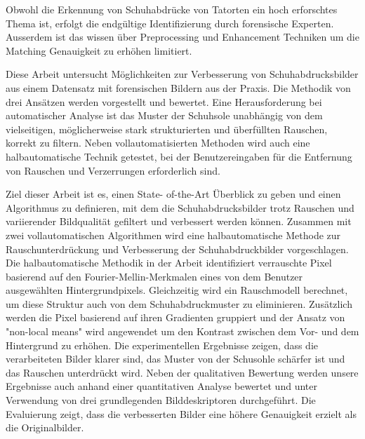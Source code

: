 \documentclass[draft,final]{vutinfth} %
\begin{document}
\frontmatter %

\addstatementpage



\begin{kurzfassung}
\par
Obwohl die Erkennung von Schuhabdrücke von Tatorten ein hoch erforschtes Thema ist, erfolgt die endgültige Identifizierung  durch forensische Experten.
Ausserdem ist das wissen über Preprocessing und Enhancement Techniken um die Matching Genauigkeit zu erhöhen limitiert.
\par
Diese Arbeit untersucht Möglichkeiten zur Verbesserung von Schuhabdrucksbilder aus einem Datensatz mit forensischen Bildern aus der Praxis. 
Die Methodik von drei Ansätzen werden vorgestellt und bewertet. 
Eine Herausforderung bei automatischer Analyse ist das Muster der Schuhsole unabhängig von dem vielseitigen, möglicherweise stark strukturierten und überfüllten Rauschen, korrekt zu filtern.
Neben vollautomatisierten Methoden wird auch eine halbautomatische Technik getestet, bei der Benutzereingaben für die Entfernung von Rauschen und Verzerrungen erforderlich sind. 
\par
Ziel dieser Arbeit ist es, einen State- of-the-Art Überblick zu geben und einen Algorithmus zu definieren, mit dem die Schuhabdrucksbilder trotz Rauschen und variierender Bildqualität gefiltert und verbessert werden können.
Zusammen mit zwei vollautomatischen Algorithmen wird eine halbautomatische Methode zur Rauschunterdrückung und Verbesserung der Schuhabdruckbilder vorgeschlagen. 
Die halbautomatische Methodik in der Arbeit identifiziert verrauschte Pixel basierend auf den Fourier-Mellin-Merkmalen eines von dem Benutzer ausgewählten Hintergrundpixels. 
Gleichzeitig wird ein Rauschmodell berechnet, um diese Struktur auch von dem Schuhabdruckmuster zu eliminieren. 
Zusätzlich werden die Pixel basierend auf ihren Gradienten gruppiert und der Ansatz von "non-local means" wird angewendet um den Kontrast zwischen dem Vor- und dem Hintergrund zu erhöhen.
Die experimentellen Ergebnisse zeigen, dass die verarbeiteten Bilder klarer sind, das Muster von der Schusohle schärfer ist und das Rauschen unterdrückt wird. 
Neben der qualitativen Bewertung werden unsere Ergebnisse auch anhand einer quantitativen Analyse bewertet und unter Verwendung von drei grundlegenden Bilddeskriptoren durchgeführt.
Die Evaluierung zeigt, dass die verbesserten Bilder eine höhere Genauigkeit erzielt als die Originalbilder.

\end{kurzfassung}
\end{document}
